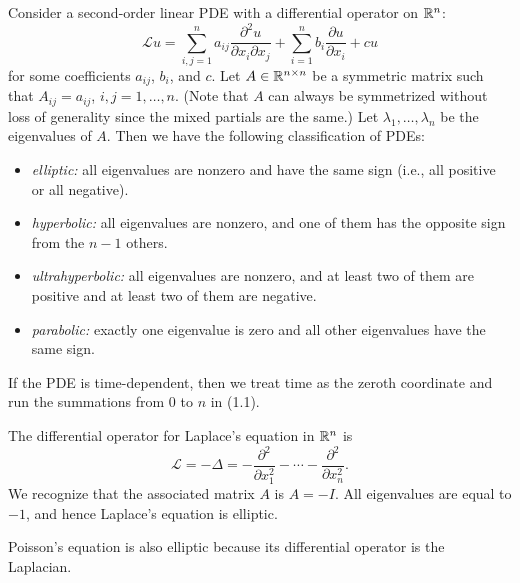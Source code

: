 \begin{definition}
    Consider a second-order linear PDE with a differential operator on $\mathbb{R}^n$:
    \begin{equation*}
        \mathcal{L} u = \sum_{i,j=1}^{n} a_{ij} \frac{\partial^2 u}{\partial x_i \partial x_j} + \sum_{i=1}^{n} b_i \frac{\partial u}{\partial x_i} + cu \tag{1.1}
    \end{equation*}
    for some coefficients $a_{ij}$, $b_i$, and $c$. Let $A \in \mathbb{R}^{n \times n}$ be a symmetric matrix such that $A_{ij} = a_{ij}$, $i, j = 1, \dots, n$. (Note that $A$ can always be symmetrized without loss of generality since the mixed partials are the same.) Let $\lambda_1, \dots, \lambda_n$ be the eigenvalues of $A$. Then we have the following classification of PDEs:
    \begin{itemize}
        \item \textit{elliptic:} all eigenvalues are nonzero and have the same sign (i.e., all positive or all negative).
        \item \textit{hyperbolic:} all eigenvalues are nonzero, and one of them has the opposite sign from the $n-1$ others.
        \item \textit{ultrahyperbolic:} all eigenvalues are nonzero, and at least two of them are positive and at least two of them are negative.
        \item \textit{parabolic:} exactly one eigenvalue is zero and all other eigenvalues have the same sign.
    \end{itemize}
    If the PDE is time-dependent, then we treat time as the zeroth coordinate and run the summations from $0$ to $n$ in (1.1).
\end{definition}

\begin{example}
    The differential operator for Laplace's equation in $\mathbb{R}^n$ is
    \[\mathcal{L} = -\Delta = -\frac{\partial^2}{\partial x_1^2} - \cdots - \frac{\partial^2}{\partial x_n^2}.\]
    We recognize that the associated matrix $A$ is $A = -I$. All eigenvalues are equal to $-1$, and hence Laplace's equation is elliptic.
\end{example}

\begin{example}
    Poisson's equation is also elliptic because its differential operator is the Laplacian.
\end{example}

